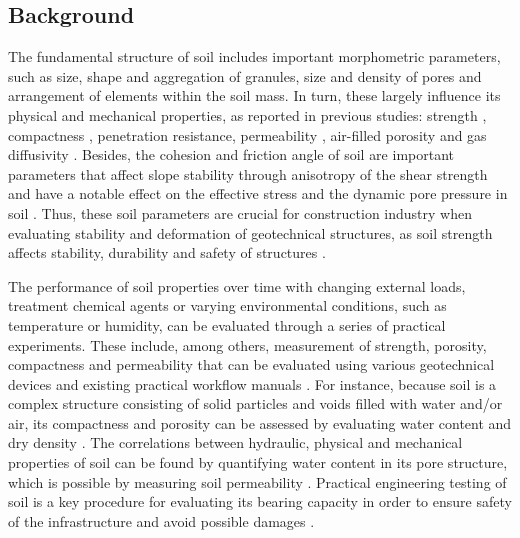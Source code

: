 \documentclass{amestyle}
\begin{document}
\subsection{Background} 
The fundamental structure of soil includes important morphometric parameters, such as size, shape and aggregation of granules, size and density of pores and arrangement of elements within the soil mass. In turn, these largely influence its physical and mechanical properties, as reported in previous studies: strength \cite{5775686}, compactness \cite{5774579,9082607,WANG2022100703}, penetration resistance, permeability \cite{GAO2022100754,CHOONG2022107075}, air-filled porosity \cite{POHL2021115124,ZHANG2021105738,ZIEGLERRIVERA2021103194} and gas diffusivity \cite{Ball}. Besides, the cohesion \cite{Deviren,KIM2021106163} and friction angle of soil \cite{MARZULLI2021813,ZOU20191,KAYA2009252} are important parameters that affect slope stability through anisotropy of the shear strength \cite{WANG20161055,STOCKTON201931} and have a notable effect on the effective stress and the dynamic pore pressure in soil \cite{YE2012111}. Thus, these soil parameters are crucial for construction industry when evaluating stability and deformation of geotechnical structures, as soil strength affects stability, durability and safety of structures \cite{747690,6802685,KULKARNI2022125363,ZHANG2020119293,WANG2022100703}. 

The performance of soil properties over time with changing external loads, treatment chemical agents or varying environmental conditions, such as temperature or humidity, can be evaluated through a series of practical experiments. These include, among others, measurement of strength, porosity, compactness and permeability that can be evaluated using various geotechnical devices and existing practical workflow manuals \cite{Day2001,Davis2008}. For instance, because soil is a complex structure consisting of solid particles and voids filled with water and/or air, its compactness and porosity can be assessed by evaluating water content and dry density \cite{Hillel}. The correlations between hydraulic, physical and mechanical properties of soil can be found by quantifying water content in its pore structure, which is possible by measuring soil permeability \cite{BARBOSA2022115673}. Practical engineering testing of soil is a key procedure for evaluating its bearing capacity in order to ensure safety of the infrastructure and avoid possible damages \cite{OBIANYO2020120677,BAKAIYANG2021e00626,HAN20181187,KAMAL20212660}. 
\end{document}
